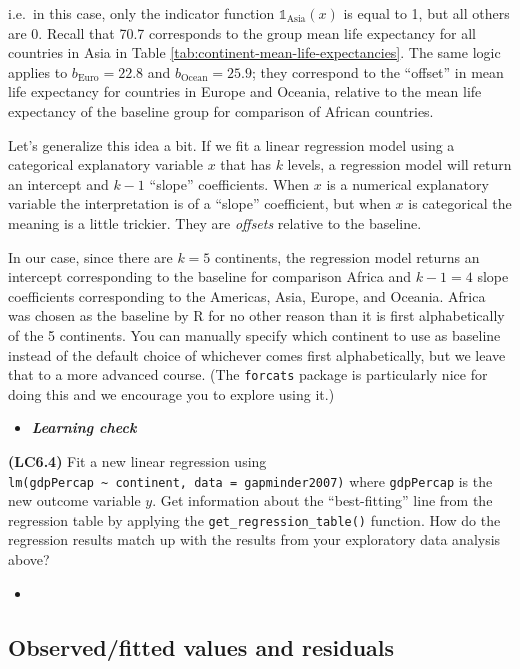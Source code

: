 \documentclass[12pt, krantz2,]{krantz}
\newenvironment{rmdblock}[1]
  {\begin{shaded*}
  \begin{itemize}
  \renewcommand{\labelitemi}{
    \raisebox{-.7\height}[0pt][0pt]{
    }
  }
  \item
  }
  {
  \end{itemize}
  \end{shaded*}
  }
\newenvironment{learncheck}
  {\begin{rmdblock}{warning}}
  {\end{rmdblock}}
\begin{document}
i.e.~in this case, only the indicator function \(\mathbb{1}_{\mbox{Asia}}(x)\) is equal to 1, but all others are 0. Recall that 70.7 corresponds to the group mean life expectancy for all countries in Asia in Table \ref{tab:continent-mean-life-expectancies}. The same logic applies to \(b_{\text{Euro}} = 22.8\) and \(b_{\text{Ocean}} = 25.9\); they correspond to the ``offset'' in mean life expectancy for countries in Europe and Oceania, relative to the mean life expectancy of the baseline group for comparison of African countries.

Let's generalize this idea a bit. If we fit a linear regression model using a categorical explanatory variable \(x\) that has \(k\) levels, a regression model will return an intercept and \(k - 1\) ``slope'' coefficients. When \(x\) is a numerical explanatory variable the interpretation is of a ``slope'' coefficient, but when \(x\) is categorical the meaning is a little trickier. They are \emph{offsets} relative to the baseline.

In our case, since there are \(k = 5\) continents, the regression model returns an intercept corresponding to the baseline for comparison Africa and \(k - 1 = 4\) slope coefficients corresponding to the Americas, Asia, Europe, and Oceania. Africa was chosen as the baseline by R for no other reason than it is first alphabetically of the 5 continents. You can manually specify which continent to use as baseline instead of the default choice of whichever comes first alphabetically, but we leave that to a more advanced course. (The \texttt{forcats} package is particularly nice for doing this and we encourage you to explore using it.)

\begin{learncheck}
\textbf{\emph{Learning check}}
\end{learncheck}

\textbf{(LC6.4)} Fit a new linear regression using \texttt{lm(gdpPercap\ \textasciitilde{}\ continent,\ data\ =\ gapminder2007)} where \texttt{gdpPercap} is the new outcome variable \(y\). Get information about the ``best-fitting'' line from the regression table by applying the \texttt{get\_regression\_table()} function. How do the regression results match up with the results from your exploratory data analysis above?

\begin{learncheck}

\end{learncheck}

\hypertarget{model2points}{%
\subsection{Observed/fitted values and residuals}\label{model2points}}
\end{document}
